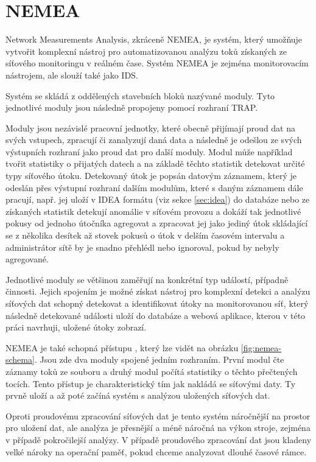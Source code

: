 \section{NEMEA}

Network Measurements Analysis, zkráceně NEMEA, je systém, který umožňuje vytvořit komplexní nástroj pro automatizovanou analýzu toků získaných ze síťového monitoringu v reálném čase. Systém NEMEA je zejména monitorovacím nástrojem, ale slouží také jako IDS.

Systém se skládá z oddělených stavebních bloků nazývané moduly. Tyto jednotlivé moduly jsou následně propojeny pomocí rozhraní TRAP.

Moduly jsou nezávislé pracovní jednotky, které obecně přijímají proud dat na svých vstupech, zpracují či zanalyzují daná data a následně je odešlou ze svých výstupních rozhraní jako proud dat pro další moduly. Modul může například tvořit statistiky o přijatých datech a na základě těchto statistik detekovat určité typy síťového útoku. Detekovaný útok je popsán datovým záznamem, který je odeslán přes výstupní rozhraní dalším modulům, které s daným záznamem dále pracují, např. jej uloží v IDEA formátu (viz sekce \ref{sec:idea}) do databáze nebo ze získaných statistik detekují anomálie v síťovém provozu a dokáží tak jednotlivé pokusy od jednoho útočníka agregovat a zpracovat jej jako jediný útok skládající se z několika desítek až stovek pokusů o útok v delším časovém intervalu a administrátor sítě by je snadno přehlédl nebo ignoroval, pokud by nebyly agregované.

Jednotlivé moduly se většinou zaměřují na konkrétní typ událostí, případně činnosti. Jejich spojením je možné získat nástroj pro komplexní detekci a analýzu síťových dat schopný detekovat a identifikovat útoky na monitorovanou síť, který následně detekované události uloží do databáze a webová aplikace, kterou v této práci navrhuji, uložené útoky zobrazí.

NEMEA je také schopná přístupu , který lze vidět na obrázku \ref{fig:nemea-schema}. Jsou zde dva moduly spojené jedním rozhraním. První modul čte záznamy toků ze souboru a druhý modul počítá statistiky o těchto přečtených tocích. Tento přístup je charakteristický tím jak nakládá se síťovými daty. Ty prvně uloží a až poté začíná systém s analýzou uložených síťových dat.

Oproti proudovému zpracování síťových dat je tento systém náročnější na prostor pro uložení dat, ale analýza je přesnější a méně náročná na výkon stroje, zejména v případě pokročilejší analýzy. V případě proudového zpracování dat jsou kladeny velké nároky na operační paměť, pokud chceme analyzovat dlouhé časové rámce.

